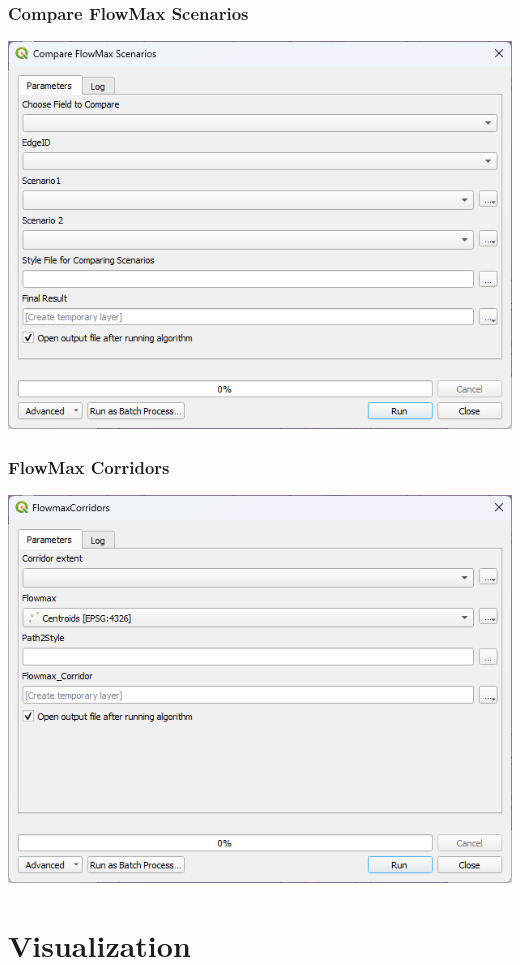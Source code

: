 \documentclass[
]{book}
\begin{document}
\section{Compare FlowMax Scenarios}\label{compare-flowmax-scenarios}

\includegraphics{./images/compare.png}

\section{FlowMax Corridors}\label{flowmax-corridors}

\includegraphics{./images/corridors.png}

\part{Visualization}\label{part-visualization}
\end{document}
